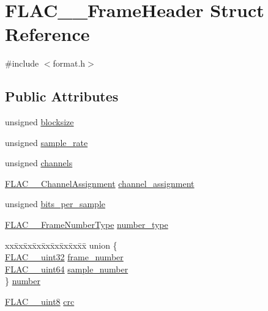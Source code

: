 \hypertarget{struct_f_l_a_c_____frame_header}{}\section{F\+L\+A\+C\+\_\+\+\_\+\+Frame\+Header Struct Reference}
\label{struct_f_l_a_c_____frame_header}


{\ttfamily \#include $<$format.\+h$>$}

\subsection*{Public Attributes}
\begin{DoxyCompactItemize}
\item 
unsigned \hyperlink{struct_f_l_a_c_____frame_header_ace760def6dcbbde3d9d140e5bfda34b3}{blocksize}
\item 
unsigned \hyperlink{struct_f_l_a_c_____frame_header_acc23daa576f4e75885bf4f2b69cee1be}{sample\+\_\+rate}
\item 
unsigned \hyperlink{struct_f_l_a_c_____frame_header_a5950c6e4f03ad81f4a03c8c6188b9bf5}{channels}
\item 
\hyperlink{group__flac__format_ga79855f8525672e37f299bbe02952ef9c}{F\+L\+A\+C\+\_\+\+\_\+\+Channel\+Assignment} \hyperlink{struct_f_l_a_c_____frame_header_a9a31f752e16da9d690f8d5ff85aed89c}{channel\+\_\+assignment}
\item 
unsigned \hyperlink{struct_f_l_a_c_____frame_header_ae1f4af58cbbb837adf670d12bc4e86f3}{bits\+\_\+per\+\_\+sample}
\item 
\hyperlink{group__flac__format_ga8fe9ebc78386cd2a3d23b7b8e3818e1c}{F\+L\+A\+C\+\_\+\+\_\+\+Frame\+Number\+Type} \hyperlink{struct_f_l_a_c_____frame_header_a7a62ec09e6f3029297179ef65377265f}{number\+\_\+type}
\item 
\begin{tabbing}
xx\=xx\=xx\=xx\=xx\=xx\=xx\=xx\=xx\=\kill
union \{\\
\>\hyperlink{ordinals_8h_a9c4005ea7ef8d564b0cc993cdd0e4e5e}{FLAC\_\_uint32} \hyperlink{struct_f_l_a_c_____frame_header_aa8f183fd8bcb5b73c392ae9ba7da4dbb}{frame\_number}\\
\>\hyperlink{ordinals_8h_aa78c8c70a3eb8a58af7436f278acde8e}{FLAC\_\_uint64} \hyperlink{struct_f_l_a_c_____frame_header_a4bbe555be68bd9fa48a22624233ee9f0}{sample\_number}\\
\} \hyperlink{struct_f_l_a_c_____frame_header_abdb6ca9267e5536f2c6e0f3e3c7adbf2}{number}\\

\end{tabbing}\item 
\hyperlink{ordinals_8h_ac49472999bc6507b4ded92a922168adf}{F\+L\+A\+C\+\_\+\+\_\+uint8} \hyperlink{struct_f_l_a_c_____frame_header_a980438c380697df6f332cb27dc4672c4}{crc}
\end{DoxyCompactItemize}


